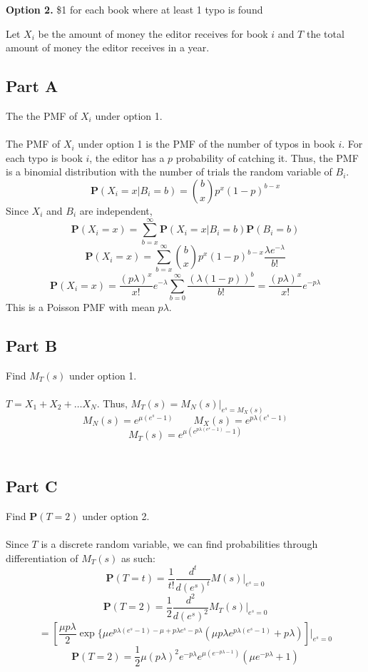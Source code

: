\documentclass{amsart}
\begin{document}
	\textbf{Option 2.} \$1 for each book where at least 1 typo is found
	
	Let $X_i$ be the amount of money the editor receives for book $i$ and $T$ the total amount of money the editor receives in a year.
	\subsection{Part A}
	The the PMF of $X_i$ under option 1.\\
	\\
	The PMF of $X_i$ under option 1 is the PMF of the number of typos in book $i$. For each typo is book $i$, the editor has a $p$ probability of catching it. Thus, the PMF is a binomial distribution with the number of trials the random variable of $B_i$.\\
	\[
	\mathbf{P}(X_i=x|B_i=b) = \binom{b}{x}p^x(1-p)^{b-x}
	\]
	Since $X_i$ and $B_i$ are independent,
	\[
	\mathbf{P}(X_i=x) = \sum_{b=x}^{\infty}\mathbf{P}(X_i=x|B_i=b)\mathbf{P}(B_i=b)
	\]
	\[
	\mathbf{P}(X_i=x) = \sum_{b=x}^{\infty}\binom{b}{x}p^x(1-p)^{b-x} \frac{\lambda e^{-\lambda}}{b!}
	\]
	\[
	\mathbf{P}(X_i=x) = 
	\frac{(p\lambda)^x}{x!}e^{-\lambda}\sum_{b=0}^{\infty}
	\frac{(\lambda(1-p))^b}{b!} = \frac{(p\lambda)^x}{x!}e^{-p\lambda}
	\]
	This is a Poisson PMF with mean $p\lambda$.
	\\
	\subsection{Part B}
	Find $M_T(s)$ under option 1.\\
	\\
	$T = X_1 + X_2 + \dots X_N$. Thus, $M_T(s) = M_N(s)|_{e^s=M_X(s)}$
	\[
	M_N(s) = e^{\mu(e^s-1)} \qquad M_X(s) = e^{p\lambda(e^s-1)}
	\]
	\[
	M_T(s) = e^{\mu\left(e^{p\lambda(e^s-1)}-1\right)}
	\]
	\\
	\subsection{Part C}
	Find \textbf{P}$(T=2)$ under option 2.\\
	\\
	Since $T$ is a discrete random variable, we can find probabilities through differentiation of $M_T(s)$ as  such:
	\[
	\mathbf{P}(T=t) = \frac{1}{t!}\frac{d^t}{d(e^s)^t}M(s)|_{e^s=0}
	\]
	\[
	\mathbf{P}(T=2) = \frac{1}{2}\frac{d^2}{d(e^s)^2}M_T(s)|_{e^s=0}
	\]
	\[
	= \left[\frac{\mu p\lambda}{2}\exp\{\mu e^{p\lambda(e^s-1)-\mu+p\lambda e^s - p\lambda}\left(\mu p\lambda e^{p\lambda(e^s-1)}+p\lambda\right)
	\right]|_{e^s=0}
	\]
	\[
	\mathbf{P}(T=2) = \frac{1}{2}\mu(p\lambda)^2 e^{-p\lambda}e^{\mu(e^{-p\lambda -1})}\left(\mu e^{-p\lambda}+1\right)
	\]
	\\
\end{document}
